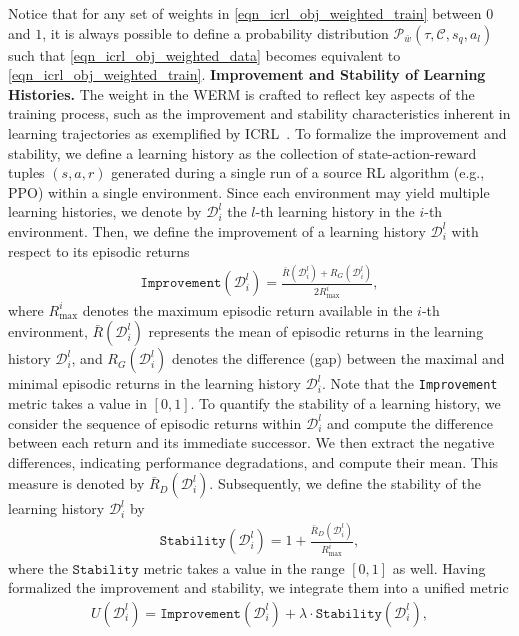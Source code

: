 \documentclass{article}
\def\ccalD{{\ensuremath{\mathcal D}}}
\begin{document}
Notice that for any set of weights in \eqref{eqn_icrl_obj_weighted_train} between $0$ and $1$, it is always possible to define a probability distribution $\mathcal{P}_{\bar{w}}(\tau,\mathcal{C},s_q,a_l)$ such that \eqref{eqn_icrl_obj_weighted_data} becomes equivalent to  \eqref{eqn_icrl_obj_weighted_train}.
\textbf{Improvement and Stability of Learning Histories.}
The weight in the WERM is crafted to reflect key aspects of the training process, such as the improvement and stability characteristics inherent in learning trajectories as exemplified by ICRL~\cite{laskin2022context, zisman2024emergence}.
To formalize the improvement and stability, we define a learning history as the collection of state-action-reward tuples $(s, a, r)$ generated during a single run of a source RL algorithm (e.g., PPO) within a single environment. Since each environment may yield multiple learning histories, we denote by $\ccalD_i^l$ the $l$-th learning history in the $i$-th environment.
Then, we define the improvement of a learning history $\ccalD_i^l$ with respect to its episodic returns
\begin{align}
    \texttt{Improvement}(\ccalD_i^l) = \frac{\bar{R}(\ccalD_i^l) + R_G(\ccalD_i^l)}{2 R_\text{max}^i},
\end{align}
where $R_\text{max}^i$ denotes the maximum episodic return available in the $i$-th environment, $\bar{R}(\ccalD_i^l)$ represents the mean of episodic returns in the learning history $\ccalD_i^l$, and $R_G(\ccalD_i^l)$ denotes the difference (gap) between the maximal and minimal episodic returns in the learning history $\ccalD_i^l$. Note that the \texttt{Improvement} metric takes a value in $[0, 1]$.
To quantify the stability of a learning history, we consider the sequence of episodic returns within $\ccalD_i^l$ and compute the difference between each return and its immediate successor. We then extract the negative differences, indicating performance degradations, and compute their mean. This measure is denoted by $\bar{R}_D(\ccalD_i^l)$. Subsequently, we define the stability of the learning history $\ccalD_i^l$ by
\begin{align}
    \texttt{Stability}(\ccalD_i^l) = 1 + \frac{\bar{R}_D(\ccalD_i^l)}{R_\text{max}^i},
\end{align}
where the $\texttt{Stability}$ metric takes a value in the range $[0, 1]$ as well.
Having formalized the improvement and stability, we integrate them into a unified metric
\begin{align}\label{eqn_metric}
    U(\ccalD_i^l) = \texttt{Improvement}(\ccalD_i^l) + \lambda \cdot \texttt{Stability}(\ccalD_i^l),
\end{align}
\end{document}

